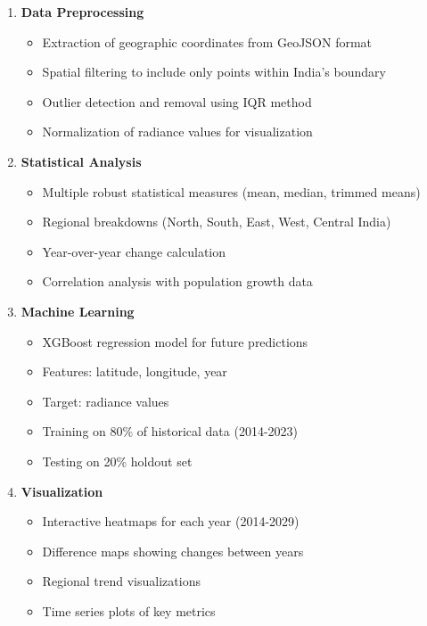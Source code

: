 \documentclass[12pt,a4paper]{article}
\begin{document}
\begin{enumerate}
    \item \textbf{Data Preprocessing}
    \begin{itemize}
        \item Extraction of geographic coordinates from GeoJSON format
        \item Spatial filtering to include only points within India's boundary
        \item Outlier detection and removal using IQR method
        \item Normalization of radiance values for visualization
    \end{itemize}
    
    \item \textbf{Statistical Analysis}
    \begin{itemize}
        \item Multiple robust statistical measures (mean, median, trimmed means)
        \item Regional breakdowns (North, South, East, West, Central India)
        \item Year-over-year change calculation
        \item Correlation analysis with population growth data
    \end{itemize}
    
    \item \textbf{Machine Learning}
    \begin{itemize}
        \item XGBoost regression model for future predictions
        \item Features: latitude, longitude, year
        \item Target: radiance values
        \item Training on 80\% of historical data (2014-2023)
        \item Testing on 20\% holdout set
    \end{itemize}
    
    \item \textbf{Visualization}
    \begin{itemize}
        \item Interactive heatmaps for each year (2014-2029)
        \item Difference maps showing changes between years
        \item Regional trend visualizations
        \item Time series plots of key metrics
    \end{itemize}
\end{enumerate}
\end{document}
